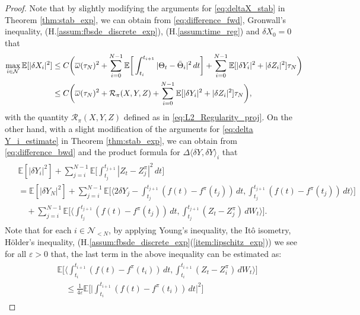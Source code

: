 \documentclass[11pt]{article}
\numberwithin{equation}{section}
\theoremstyle{definition}
\theoremstyle{remark}
\def\ol{\overline} \def\cl{\centerline}   \def\ul{\underline}
\def\l{\label}  \def\f{\frac}  \def\fa{\forall}
\def\eps{\varepsilon}
\def \la{\langle} \def\ra{\rangle}
\def\cN{\mathcal{N}}
\def\cR{\mathcal{R}}
\def\sE{{\mathbb{E}}}
\begin{document}
\begin{proof}
Note that
by slightly modifying the arguments for \eqref{eq:deltaX_stab} in Theorem \ref{thm:stab_exp},
we 
can obtain from \eqref{eq:difference_fwd},
 Gronwall's inequality, 
 (H.\ref{assum:fbsde_discrete_exp}),
 (H.\ref{assum:time_reg}) 
 and
  $\delta X_0=0$ 
 that
\begin{align}
\max_{i\in \cN}\sE[  |\delta X_{i}|^2]
\nb
  &\le
 C\bigg(
 \ol{\om}(\tau_N)^2+\sum_{i=0}^{N-1}
\sE \bigg[\int_{t_i}^{t_{i+1}} 
 |\Theta_t-\bar{\Theta}_i|^2
\,dt\bigg]
+\sum_{i=0}^{N-1} \sE[
|\delta {Y}_{i}|^2
+|\delta {Z}_{i}|^2
]\tau_N
 \bigg)
 \nb
 \\
 &\le 
  C\bigg(
 \ol{\om}(\tau_N)^2+
 \cR_\pi(X,Y,Z)
+\sum_{i=0}^{N-1} \sE[
|\delta {Y}_{i}|^2
+|\delta {Z}_{i}|^2
]\tau_N
 \bigg),
 \label{eq:time_error_X}
  \end{align}
with the quantity $\cR_\pi(X,Y,Z)$ defined as in \eqref{eq:L2_Regularity_proj}.
On the other hand, 
with a slight modification of  the arguments for 
\eqref{eq:delta Y_i_estimate}
 in Theorem \ref{thm:stab_exp},
we  can obtain from \eqref{eq:difference_bwd}
and the product formula for $\Delta \la \delta Y,\delta Y\ra_i$
that
\begin{align*}%
\begin{split}
&\sE[|\delta Y_{i}|^2]+\sum_{j=i}^{N-1}\sE\bigg[\int_{t_j}^{t_{j+1}}| Z_t- {Z}^\pi_j|^2\,dt\bigg]
\\
&=
\sE[|\delta Y_{N}|^2]
+\sum_{j=i}^{N-1} 
 \sE\bigg[   \bigg \la 2\delta Y_{j}- \int_{t_j}^{t_{j+1}}(f(t)-{f}^\pi(t_{j}))\,dt,
  \int_{t_j}^{t_{j+1}}(f(t)-{f}^\pi(t_{j}))\,dt
 \bigg \ra \bigg] 
 \\
 & \quad
 +\sum_{j=i}^{N-1} 
 \sE\bigg[   \bigg \la  \int_{t_j}^{t_{j+1}}(f(t)-{f}^\pi(t_{j}))\,dt,
  \int_{t_j}^{t_{j+1}} ({Z}_t-Z^\pi_j)\,d W_t
 \bigg \ra \bigg].
 \end{split}
\end{align*}
Note that for each $i\in \cN_{<N}$, by 
applying Young's inequality,
the It\^{o} isometry,  H\"{o}lder's inequality,
 (H.\ref{assum:fbsde_discrete_exp}(\ref{item:lipschitz_exp}))
we see  for all $\eps>0$ that,
 the last term in the above inequality can be estimated as:
\begin{align*}%
\begin{split}
 &\sE\bigg[   \bigg \la  \int_{t_i}^{t_{i+1}}(f(t)-{f}^\pi(t_{i}))\,dt,
  \int_{t_i}^{t_{i+1}} ({Z}_t-Z^\pi_i)\,d W_t
 \bigg \ra \bigg]
 \\
 &\quad 
 \le
\frac{1}{4\eps} \sE\bigg[   \bigg|  \int_{t_i}^{t_{i+1}}(f(t)-{f}^\pi(t_{i}))\,dt\bigg|^2\bigg]

\end{split}
\end{align*}
\end{proof}
\end{document}
